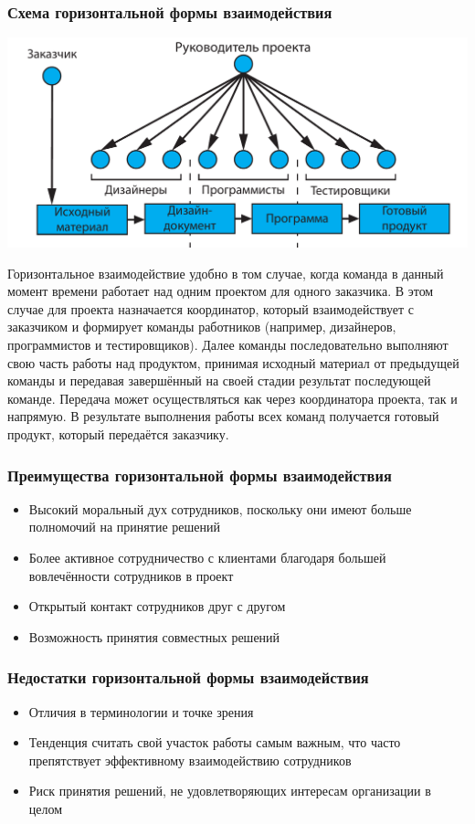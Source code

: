 \documentclass{../industrial-development}
\begin{document}
\begin{frame} \frametitle{Схема горизонтальной формы взаимодействия}
	\begin{block}{}
		\centerline{\includegraphics[width=1\textwidth]{horizontal.pdf}}
	\end{block}
\end{frame}

\lecturenotes 
Горизонтальное взаимодействие удобно в том случае, когда команда в данный момент времени работает над одним проектом для одного заказчика. В этом случае для проекта назначается координатор, который взаимодействует с заказчиком и формирует команды работников (например, дизайнеров, программистов и тестировщиков). Далее команды последовательно выполняют свою часть работы над продуктом, принимая исходный материал от предыдущей команды и передавая завершённый на своей стадии результат последующей команде. Передача может осуществляться как через координатора проекта, так и напрямую. В результате выполнения работы всех команд получается готовый продукт, который передаётся заказчику.

\begin{frame} \frametitle{Преимущества горизонтальной формы взаимодействия}
  
	\begin{itemize}
		\item Высокий моральный дух сотрудников, поскольку они имеют больше полномочий на принятие решений
		\item Более активное сотрудничество с клиентами благодаря большей вовлечённости сотрудников в проект
		\item Открытый контакт сотрудников друг с другом
		\item Возможность принятия совместных решений
	\end{itemize}
\end{frame}

\begin{frame} \frametitle{Недостатки горизонтальной формы взаимодействия}
	
	\begin{itemize}
		\item Отличия в терминологии и точке зрения
		\item Тенденция считать свой участок работы самым важ­ным, что часто препятствует эффективному взаимодей­ствию сотрудников
		\item Риск принятия решений, не удовлетворяющих интересам организации в целом
	\end{itemize}
\end{frame}
\end{document}
